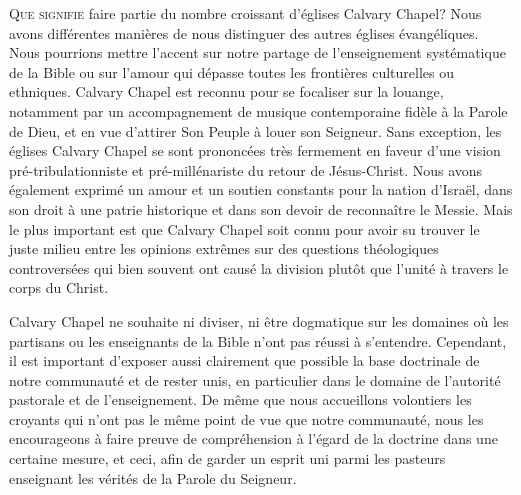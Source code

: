 
\begin{specialpar}{}
\lettrine{Q}{ue signifie} faire partie du nombre \pocketlinebreak
 croissant d'églises Calvary Chapel?
 Nous avons différentes manières de nous distinguer des autres églises évangéliques.
 Nous pourrions mettre l'accent sur notre partage de l'enseignement systématique \pocketlinebreak
 de la Bible
 ou sur l'amour qui dépasse tou\-tes les frontières culturelles ou ethniques.
Calvary Chapel est reconnu pour se focaliser sur la louange,
 notamment par un
 accompagnement de musique con\-tem\-po\-rai\-ne fidèle à la Parole de Dieu,
 et en vue d'attirer Son Peuple à louer son Seigneur.
 Sans exception, les églises Calvary Chapel se sont prononcées très fermement
 en faveur d'une vision pré-tribulationniste et pré-millénariste du retour de Jésus-Christ.
Nous avons également exprimé un amour et un soutien constants pour la nation
 d'Israël,
 dans son droit à une patrie historique  et dans son devoir de reconnaître le Messie.
 Mais le plus important est que Calvary Chapel soit connu pour avoir su trouver
 le juste milieu entre les opinions extrêmes sur des questions théologiques
 controversées qui bien souvent ont causé la division plutôt que l'unité
 à travers le corps du Christ.
\end{specialpar}

Calvary Chapel ne souhaite ni diviser, ni être dogmatique sur les domaines où les partisans
 ou les enseignants de la Bible n'ont pas réussi à s'entendre.
 Cependant, il est important d'exposer aussi clairement que possible la base doctrinale
 de notre communauté et de rester unis, en particulier dans le domaine de l'autorité pastorale
 et de l'enseignement. De même que nous accueillons volontiers les croyants qui
 n'ont pas
 le même point de vue que notre communauté, nous les encourageons à 
 faire preuve de compréhension
 à l'égard de la doctrine dans une certaine mesure, et ceci, afin de garder un esprit uni
 parmi les pasteurs enseignant les vérités de la Parole du Seigneur.

